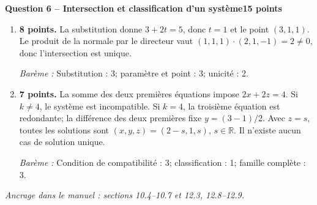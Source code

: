 \documentclass[11pt,a4paper]{article}
\begin{document}
\newpage
{\large\bfseries Question 6 -- Intersection et classification d’un système}\hfill\textbf{15 points}\par
\begin{enumerate}
\item \textbf{8 points.} La substitution donne \(3+2t=5\), donc \(t=1\) et le point \((3,1,1)\). Le produit de la normale par le directeur vaut \((1,1,1)\cdot(2,1,-1)=2\ne0\), donc l’intersection est unique.
\par{\small\textit{Barème : }Substitution : 3; paramètre et point : 3; unicité : 2.}
\item \textbf{7 points.} La somme des deux premières équations impose \(2x+2z=4\). Si \(k\ne4\), le système est incompatible. Si \(k=4\), la troisième équation est redondante; la différence des deux premières fixe \(y=(3-1)/2\). Avec \(z=s\), toutes les solutions sont \((x,y,z)=(2-s,1,s)\), \(s\in\mathbb R\). Il n’existe aucun cas de solution unique.
\par{\small\textit{Barème : }Condition de compatibilité : 3; classification : 1; famille complète : 3.}
\end{enumerate}
\vfill {\small\textit{Ancrage dans le manuel : sections 10.4--10.7 et 12.3, 12.8--12.9.}}
\end{document}
